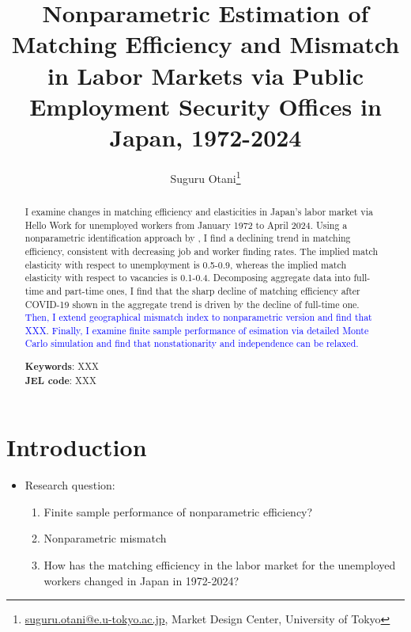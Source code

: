 \documentclass[12pt]{article}
\begin{document}
\title{Nonparametric Estimation of Matching Efficiency and Mismatch in Labor Markets via Public Employment Security Offices in Japan, 1972-2024}
\author{Suguru Otani\thanks{\href{mailto:}{suguru.otani@e.u-tokyo.ac.jp}, Market Design Center, University of Tokyo}}
\maketitle

\begin{abstract}
\noindent

I examine changes in matching efficiency and elasticities in Japan's labor market via Hello Work for unemployed workers from January 1972 to April 2024. 
Using a nonparametric identification approach by \cite{lange2020beyond}, I find a declining trend in matching efficiency, consistent with decreasing job and worker finding rates. 
The implied match elasticity with respect to unemployment is 0.5-0.9, whereas the implied match elasticity with respect to vacancies is 0.1-0.4.
Decomposing aggregate data into full-time and part-time ones, I find that the sharp decline of matching efficiency after COVID-19 shown in the aggregate trend is driven by the decline of full-time one.
\textcolor{blue}{Then, I extend geographical mismatch index to nonparametric version and find that XXX}.
\textcolor{blue}{Finally, I examine finite sample performance of esimation via detailed Monte Carlo simulation and find that nonstationarity and independence can be relaxed.}

\textbf{Keywords}: XXX \\
\textbf{JEL code}: XXX
\end{abstract}

\section{Introduction}

\begin{itemize}
    \item Research question: 
    \begin{enumerate}
        \item Finite sample performance of nonparametric efficiency?
        \item Nonparametric mismatch
        \item How has the matching efficiency in the labor market for the unemployed workers changed in Japan in 1972-2024?
    \end{enumerate}
\end{itemize}
\end{document}
